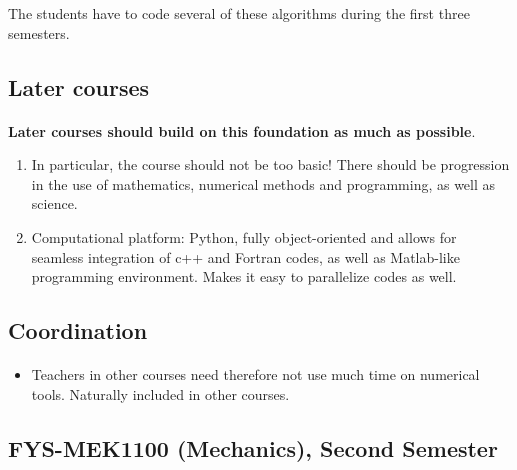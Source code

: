 \documentclass[%
twoside,                 %
final,                   %
10pt]{article}
\begin{document}
\noindent
The students have to code several of these algorithms during the first three semesters.




\subsection{Later courses}

\paragraph{}

\textbf{Later courses should build on this foundation as much as possible}.

\begin{enumerate}
\item In particular, the course should not be too basic! There should be progression in the use of mathematics, numerical methods and programming, as well as science.

\item Computational platform: Python, fully object-oriented and allows for seamless integration of c++ and Fortran codes, as well as Matlab-like programming environment. Makes it easy to parallelize codes as well.
\end{enumerate}

\noindent



\subsection{Coordination}

\paragraph{}
\begin{itemize}
\item Teachers in other courses need therefore not use much time on numerical tools. Naturally included in other courses.
\end{itemize}

\noindent





\subsection{FYS-MEK1100 (Mechanics), Second Semester}
\end{document}
